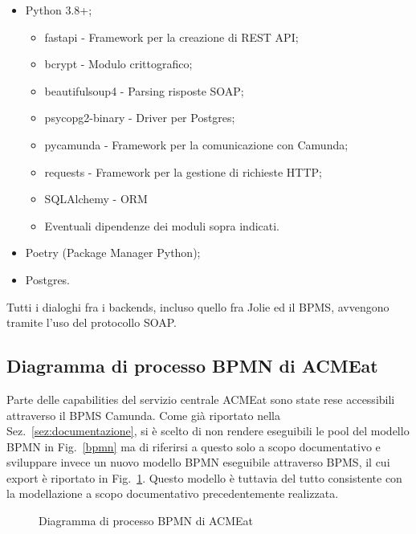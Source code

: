 \documentclass[11pt]{article} %
\begin{document}
\begin{itemize}
\item Python 3.8+;
\begin{itemize}
\item fastapi - Framework per la creazione di REST API;
\item bcrypt - Modulo crittografico;
\item beautifulsoup4 - Parsing risposte SOAP;
\item psycopg2-binary - Driver per Postgres;
\item pycamunda - Framework per la comunicazione con Camunda;
\item requests - Framework per la gestione di richieste HTTP;
\item SQLAlchemy - ORM
\item Eventuali dipendenze dei moduli sopra indicati.
\end{itemize}
\item Poetry (Package Manager Python);
\item Postgres.
\end{itemize}
Tutti i dialoghi fra i backends, incluso quello fra Jolie ed il BPMS, avvengono tramite l'uso del protocollo SOAP.

\subsection{Diagramma di processo BPMN di ACMEat}

 Parte delle capabilities del servizio centrale ACMEat sono state rese accessibili attraverso il BPMS Camunda. Come già riportato nella Sez.~\ref{sez:documentazione}, si è scelto di non rendere eseguibili le pool del modello BPMN in Fig.~\ref{bpmn} ma di riferirsi a questo solo a scopo documentativo e sviluppare invece un nuovo modello BPMN eseguibile attraverso BPMS, il cui export è riportato in Fig.~\ref{bpms}. Questo modello è tuttavia del tutto consistente con la modellazione a scopo documentativo precedentemente realizzata.

\begin{figure}[H]
\caption{Diagramma di processo BPMN di ACMEat}
\label{bpms}
\end{figure}
\end{document}
